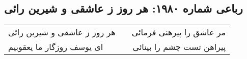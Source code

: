 \begin{center}
\section*{رباعی شماره ۱۹۸۰: هر روز ز عاشقی و شیرین رائی}
\label{sec:1980}
\begin{longtable}{l p{0.5cm} r}
هر روز ز عاشقی و شیرین رائی
&&
مر عاشق را پیرهنی فرمائی
\\
ای یوسف روزگار ما یعقوبیم
&&
پیراهن تست چشم را بینائی
\\
\end{longtable}
\end{center}
